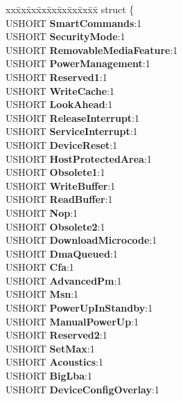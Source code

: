 \begin{DoxyCompactItemize}
\begin{tabbing}
\end{tabbing}\item 
\mbox{\label{struct___i_d_e_n_t_i_f_y___d_e_v_i_c_e___d_a_t_a_a56e8c63e8db4d59aa682921169bec8db}} 
\begin{tabbing}
xx\=xx\=xx\=xx\=xx\=xx\=xx\=xx\=xx\=\kill
struct \{\\
\>USHORT {\bfseries SmartCommands}:1\\
\>USHORT {\bfseries SecurityMode}:1\\
\>USHORT {\bfseries RemovableMediaFeature}:1\\
\>USHORT {\bfseries PowerManagement}:1\\
\>USHORT {\bfseries Reserved1}:1\\
\>USHORT {\bfseries WriteCache}:1\\
\>USHORT {\bfseries LookAhead}:1\\
\>USHORT {\bfseries ReleaseInterrupt}:1\\
\>USHORT {\bfseries ServiceInterrupt}:1\\
\>USHORT {\bfseries DeviceReset}:1\\
\>USHORT {\bfseries HostProtectedArea}:1\\
\>USHORT {\bfseries Obsolete1}:1\\
\>USHORT {\bfseries WriteBuffer}:1\\
\>USHORT {\bfseries ReadBuffer}:1\\
\>USHORT {\bfseries Nop}:1\\
\>USHORT {\bfseries Obsolete2}:1\\
\>USHORT {\bfseries DownloadMicrocode}:1\\
\>USHORT {\bfseries DmaQueued}:1\\
\>USHORT {\bfseries Cfa}:1\\
\>USHORT {\bfseries AdvancedPm}:1\\
\>USHORT {\bfseries Msn}:1\\
\>USHORT {\bfseries PowerUpInStandby}:1\\
\>USHORT {\bfseries ManualPowerUp}:1\\
\>USHORT {\bfseries Reserved2}:1\\
\>USHORT {\bfseries SetMax}:1\\
\>USHORT {\bfseries Acoustics}:1\\
\>USHORT {\bfseries BigLba}:1\\
\>USHORT {\bfseries DeviceConfigOverlay}:1\\

\end{tabbing}
\end{DoxyCompactItemize}
